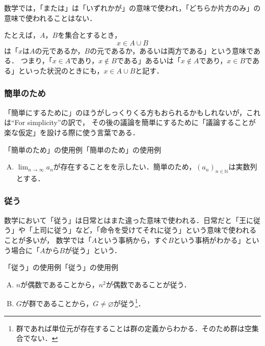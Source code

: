 \documentclass[a4paper,11pt]{ltjsarticle}
\begin{document}
数学では，「または」は「いずれかが」の意味で使われ，「どちらか片方のみ」の意味で使われることはない．

たとえば，$A$，$B$を集合とするとき，
\[
x \in A \cup B
\]
は「$x$は$A$の元であるか，$B$の元であるか，あるいは両方である」という意味である．
つまり，「$ x \in A$であり，$x \notin  B$である」あるいは「$ x \notin A$であり，$x \in B$である」といった状況のときにも，$x \in A \cup B$と記す．

\subsubsection{簡単のため}

「簡単にするために」のほうがしっくりくる方もおられるかもしれないが，これは``For simplicity''の訳で，
その後の議論を簡単にするために「議論することが楽な仮定」を設ける際に使う言葉である．

\begin{example}{「簡単のため」の使用例}{「簡単のため」の使用例}
    \begin{enumerate}[(A)]
  \item $\lim_{n \to \infty} a_n$が存在することをを示したい．簡単のため，$(a_n)_{n \in \mathbb{N}}$は実数列とする．
  \end{enumerate}
\end{example}

\subsubsection{従う}

数学において「従う」は日常とはまた違った意味で使われる．日常だと「王に従う」や「上司に従う」など，「命令を受けてそれに従う」という意味で使われることが多いが，
数学では「$A$という事柄から，すぐ$B$という事柄がわかる」という場合に「$A$から$B$が従う」という．

\begin{example}{「従う」の使用例}{「従う」の使用例}
    \begin{enumerate}[(A)]
  \item $n$が偶数であることから，$n^2$が偶数であることが従う．\label{enu:偶数ならば偶数}
  \item $G$が群であることから，$G \ne \varnothing$が従う\footnote{群であれば単位元が存在することは群の定義からわかる．そのため群は空集合でない．}．\label{enu:群の例}
\end{enumerate}
\end{example}
\end{document}
